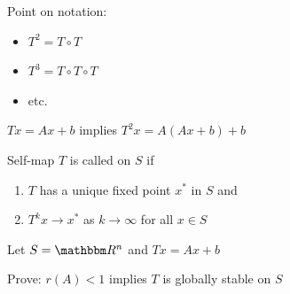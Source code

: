 \begin{frame}
    
    Point on notation:
    \begin{itemize}
        \item $T^2 = T \circ T$
            \vspace{0.4em}
        \item $T^3 = T \circ T \circ T$
            \vspace{0.4em}
        \item etc.
    \end{itemize}
            \vspace{0.4em}
            \vspace{0.4em}
            \vspace{0.4em}


    \Eg $Tx = Ax + b$ implies $T^2x = A(Ax + b) + b$

\end{frame}



\begin{frame}
    
    Self-map $T$ is called  on $S$
    if 
    \begin{enumerate}
        \item $T$ has a unique fixed point $x^*$ in $S$ and
            \vspace{0.4em}
        \item $T^k x \to x^*$ as $k \to \infty$ for all $x \in S$  
    \end{enumerate}

    \vspace{1em}
    \vspace{1em}

    \Eg Let $S = \RR^n$ and $Tx = Ax + b$

            \vspace{0.4em}
    \Ex Prove: $r(A) < 1$ implies $T$ is globally stable on $S$

\end{frame}



